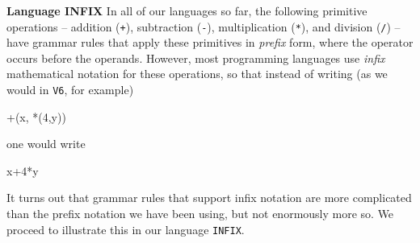 \begin{minipage}[t]{\sw}
\slidenumber
\LARGE
{\bf Language INFIX}\exx
In all of our languages so far, the following primitive operations --
addition (\verb'+'),
subtraction (\verb'-'),
multiplication (\verb'*'),
and division (\verb'/') --
have grammar rules that apply these primitives in {\em prefix} form,
where the operator occurs before the operands.
However, most programming languages use {\em infix} mathematical notation
for these operations,
so that instead of writing (as we would in \verb'V6', for example)
\begin{qv}
+(x, *(4,y))
\end{qv}
one would write
\begin{qv}
x+4*y
\end{qv}
It turns out that grammar rules that support infix notation
are more complicated than the prefix notation we have been using,
but not enormously more so.
We proceed to illustrate this in our language \verb'INFIX'.\exx
\end{minipage}
